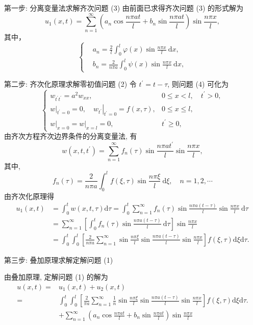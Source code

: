 第一步: 分离变量法求解齐次问题 (3)
由前面已求得齐次问题 (3) 的形式解为
$$
u_{1}(x, t)=\sum_{n=1}^{\infty}\left(a_{n} \cos \frac{n \pi a t}{l}+b_{n} \sin \frac{n \pi a t}{l}\right) \sin \frac{n \pi x}{l},
$$
其中，
$$
\left\{\begin{aligned}
&a_{n}=\frac{2}{l} \int_{0}^{l} \varphi(x) \sin \frac{n \pi x}{l} \mathrm{~d} x, \\
&b_{n}=\frac{2}{n \pi a} \int_{0}^{l} \psi(x) \sin \frac{n \pi x}{l} \mathrm{~d} x,
\end{aligned}\right.
$$

第二步: 齐次化原理求解零初值问题 (2)
令 $ t^{\prime}=t-\tau $, 则问题 (4) 可化为
$$
\left\{\begin{array}{ll}
w_{t^{\prime} t^{\prime}}=a^{2} w_{x x}, & 0 \leqslant x<l, \quad t^{\prime}>0, \\
\left.w\right|_{t^{\prime}=0}=0,\left.\quad w_{t^{\prime}}\right|_{t^{\prime}=0}=f(x, \tau), & 0 \leqslant x \leqslant l, \\
\left.w\right|_{x=0}=\left.w\right|_{x=l}=0, & t^{\prime} \geqslant 0,
\end{array}\right.
$$
由齐次方程齐次边界条件的分离变量法, 有 
$$
w\left(x, t, t^{\prime}\right)=\sum_{n=1}^{\infty} f_{n}(\tau) \sin \frac{n \pi a t^{\prime}}{l} \sin \frac{n \pi x}{l},
$$
其中,
$$
f_{n}(\tau)=\frac{2}{n \pi a} \int_{0}^{l} f(\xi, \tau) \sin \frac{n \pi \xi}{l} \mathrm{~d} \xi, \quad n=1,2, \cdots
$$
由齐次化原理得
$$
\begin{aligned}
u_{1}(x, t) & =\int_{0}^{t} w(x, t, \tau) \mathrm{d} \tau=\int_{0}^{t} \sum_{n=1}^{\infty} f_{n}(\tau) \sin \frac{n \pi a(t-\tau)}{l} \sin \frac{n \pi x}{l} \mathrm{~d} \tau \\
& =\sum_{n=1}^{\infty}\left[\int_{0}^{t} f_{n}(\tau) \sin \frac{n \pi a(t-\tau)}{l} \mathrm{~d} \tau\right] \sin \frac{n \pi x}{l} \\
& =\int_{0}^{t} \int_{0}^{l} \left[\frac{2}{n \pi a} \sum_{n=1}^{\infty} \sin \frac{n \pi \xi}{l} \sin \frac{n \pi a(t-\tau)}{l} \sin \frac{n \pi x}{l}\right]f(\xi, \tau) \mathrm{d} \xi \mathrm{d} \tau .
\end{aligned}
$$

第三步: 叠加原理求解定解问题 (1)

由叠加原理, 定解问题 (1) 的解为
$$
\begin{aligned}
u(x, t)= & u_{1}(x, t)+u_{2}(x, t) \\
= &\int_{0}^{t} \int_{0}^{l}\left[\frac{2}{\pi a} \sum_{n=1}^{\infty} \frac{1}{n} \sin \frac{n \pi \xi}{l} \sin \frac{n \pi a(t-\tau)}{l} \sin \frac{n \pi x}{l}\right] f(\xi, \tau) \mathrm{d} \xi \mathrm{d} \tau .\\
&+ \sum_{n=1}^{\infty}\left(a_{n} \cos \frac{n \pi a t}{l}+b_{n} \sin \frac{n \pi a t}{l}\right) \sin \frac{n \pi x}{l} \\
\end{aligned}
$$

